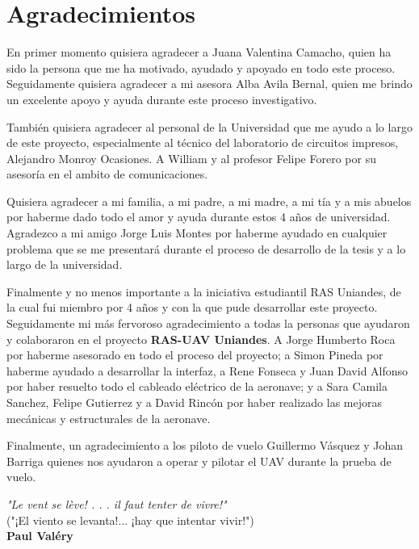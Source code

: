   \section{Agradecimientos}

En primer momento quisiera agradecer a Juana Valentina Camacho, quien ha sido la persona que me ha motivado, ayudado y apoyado en todo este proceso. Seguidamente quisiera agradecer a mi asesora Alba Avila Bernal, quien me brindo un excelente apoyo y ayuda durante este proceso investigativo. \vspace{5px}

También quisiera agradecer al personal de la Universidad que me ayudo a lo largo de este proyecto, especialmente al técnico del laboratorio de circuitos impresos, Alejandro Monroy Ocasiones. A William y al profesor Felipe Forero por su asesoría en el ambito de comunicaciones.\vspace{5px}

Quisiera agradecer a mi familia, a mi padre, a mi madre, a mi tía y a mis abuelos por haberme dado todo el amor y ayuda durante estos 4 años de universidad. Agradezco a mi amigo Jorge Luis Montes  por haberme ayudado en cualquier problema que se me presentará durante el proceso de desarrollo de la tesis y a lo largo de la universidad. \vspace{5px}

Finalmente y no menos importante a la iniciativa estudiantil RAS Uniandes, de la cual fui miembro por 4 años y con la que pude desarrollar este proyecto. Seguidamente mi más fervoroso agradecimiento a todas la personas que ayudaron y colaboraron en el proyecto \textbf{RAS-UAV Uniandes}. A Jorge Humberto Roca por haberme asesorado en todo el proceso del proyecto; a Simon Pineda por haberme ayudado a desarrollar la interfaz, a Rene Fonseca y Juan David Alfonso por haber resuelto todo el cableado eléctrico de la aeronave; y a Sara Camila Sanchez, Felipe Gutierrez y a David Rincón por haber realizado las mejoras mecánicas y estructurales de la aeronave. \vspace{5px}

Finalmente, un agradecimiento a los piloto de vuelo Guillermo Vásquez y Johan Barriga quienes nos ayudaron a operar y pilotar el UAV durante la prueba de vuelo.



\begin{flushright}
\textit{"Le vent se lève! . . . il faut tenter de vivre!"}\\
("¡El viento se levanta!... ¡hay que intentar vivir!")\\
\textbf{Paul Valéry}
\end{flushright}